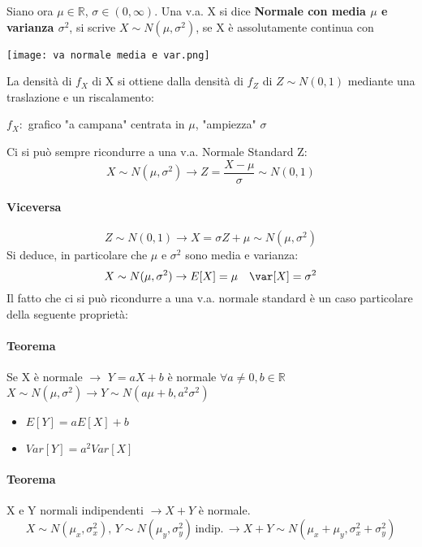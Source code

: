 Siano ora $\mu \in \mathbb{R}$, $\sigma \in (0, \infty)$.
Una v.a. X si dice \textbf{Normale con media $\mu$ e varianza $\sigma^2$}, si scrive
\textbf{$X \sim N(\mu, \sigma^2)$}, se X è assolutamente continua con
\begin{center}
	\texttt{[image: va normale media e var.png]}
\end{center}
La densità di $f_X$ di X si ottiene dalla densità di $f_Z$ di $Z \sim N(0,1)$
mediante una traslazione e un riscalamento:
\begin{center}
	$f_X:$ grafico "a campana" centrata in $\mu$, "ampiezza" $\sigma$
\end{center}
Ci si può sempre ricondurre a una v.a. Normale Standard Z:
\begin{equation*}
	X \sim N(\mu, \sigma^2) \rightarrow Z = \frac{X-\mu}{\sigma} \sim N(0,1)
\end{equation*}
\paragraph*{Viceversa}
\begin{equation*}
	Z \sim N(0,1) \rightarrow X = \sigma Z + \mu \sim N(\mu, \sigma^2)
\end{equation*}
Si deduce, in particolare che $\mu$ e $\sigma^2$ sono media e varianza:
\begin{equation*}
	X \sim N(\mu, \sigma^2) \rightarrow E[X] = \mu \quad \var[X] = \sigma^2
\end{equation*}
Il fatto che ci si può ricondurre a una v.a. normale standard è un caso particolare
della seguente proprietà:
\paragraph*{Teorema} Se X è normale $\rightarrow$ $Y = aX+b$ è normale
$\forall a \neq 0, b \in \mathbb{R}$
\\ $ X \sim N(\mu, \sigma^2) \rightarrow Y \sim N(a \mu+b, a^2 \sigma^2)$
\begin{itemize}
	\item $E[Y] = aE[X]+b$
	\item $Var[Y] = a^2 Var[X]$
\end{itemize}
\paragraph*{Teorema} X e Y normali indipendenti $\rightarrow X+Y$ è normale.
\begin{equation*}
	X \sim N(\mu_x, \sigma^{2}_x), \, Y \sim N(\mu_y, \sigma^{2}_y)\, \text{indip.}\,
	\rightarrow X+Y \sim N(\mu_x+\mu_y, \sigma^{2}_x + \sigma^{2}_y)
\end{equation*}
